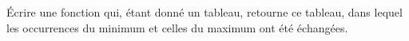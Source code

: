Écrire une fonction qui, étant donné un tableau, retourne ce tableau, dans
lequel les occurrences du minimum et celles du maximum ont été échangées.